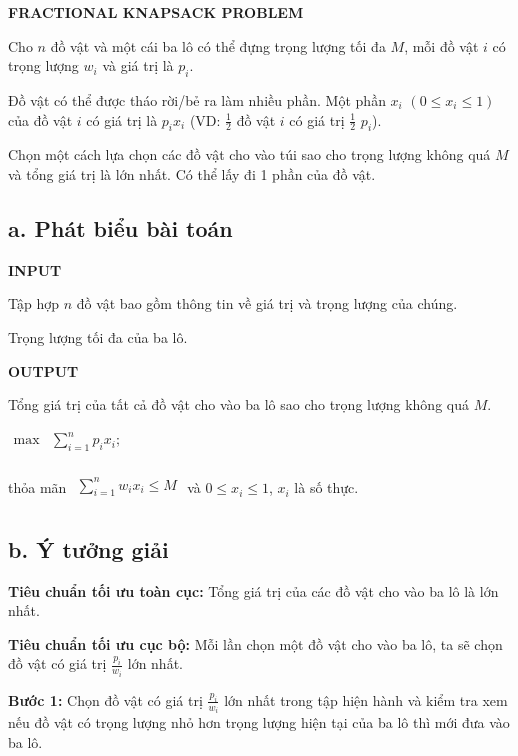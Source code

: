 \documentclass[12pt, a4paper, fleqn]{article}
\begin{document}
	\textbf{FRACTIONAL KNAPSACK PROBLEM}
	
	Cho $n$ đồ vật và một cái ba lô có thể đựng trọng lượng tối đa $M$, mỗi đồ vật $i$ có trọng lượng $w_i$ và giá trị là $p_i$.
	
	Đồ vật có thể được tháo rời/bẻ ra làm nhiều phần. Một phần $x_i$ $(0 \leq x_i \leq 1)$ của đồ vật $i$ có giá trị là $p_i x_i$ (VD: $\frac{1}{2}$ đồ vật $i$ có giá trị $\frac{1}{2}$ $p_i$).
	
	Chọn một cách lựa chọn các đồ vật cho vào túi sao cho trọng lượng không quá $M$ và tổng giá trị là lớn nhất. Có thể lấy đi 1 phần của đồ vật.
	
	\subsection*{a. Phát biểu bài toán}
	
	\textbf{INPUT}
	
	Tập hợp $n$ đồ vật bao gồm thông tin về giá trị và trọng lượng của chúng.
	
	Trọng lượng tối đa của ba lô.
	
	\textbf{OUTPUT}
	
	Tổng giá trị của tất cả đồ vật cho vào ba lô sao cho trọng lượng không quá $M$.
	
	${\displaystyle
		{\begin{aligned}
			\max &\sum _{ i = 1}^{n}p_i x_i;\\
		\end{aligned}}}$
	
	thỏa mãn ${\displaystyle
		{\begin{aligned}
			\sum _{ i = 1}^{n}w_i x_i \leq M\\
		\end{aligned}}}$ và $0 \leq x_i \leq 1$, $x_i$ là số thực.
	
	\subsection*{b. Ý tưởng giải}
	
	\textbf{Tiêu chuẩn tối ưu toàn cục:} Tổng giá trị của các đồ vật cho vào ba lô là lớn nhất.

	\textbf{Tiêu chuẩn tối ưu cục bộ:} Mỗi lần chọn một đồ vật cho vào ba lô, ta sẽ chọn đồ vật có giá trị $\displaystyle \frac{p_i}{w_i}$ lớn nhất.

	\textbf{Bước 1:} Chọn đồ vật có giá trị $\displaystyle \frac{p_i}{w_i}$ lớn nhất trong tập hiện hành và kiểm tra xem nếu đồ vật có trọng lượng nhỏ hơn trọng lượng hiện tại của ba lô thì mới đưa vào ba lô.
	
\end{document}
